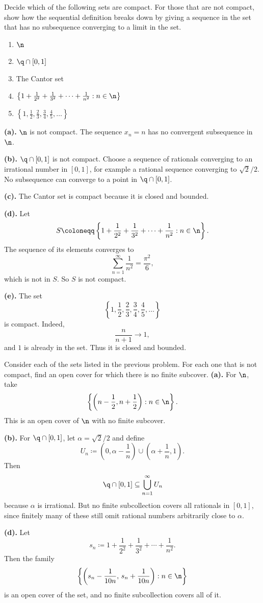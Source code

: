 \begin{problem}{
    Decide which of the following sets are compact.
    For those that are not compact, show how the sequential definition breaks down by giving a sequence in the set that has no subsequence converging to a limit in the set.
    \begin{enumerate}[label={(\alph*)}]
	\item $\n$
    \item $\q\cap[0,1]$
    \item The Cantor set
    \item $\left\{1+\frac1{2^2}+\frac1{3^2}+\cdots+\frac1{n^2}: n\in\n\right\}$
    \item $\left\{1,\frac12,\frac23,\frac34,\frac45,\ldots\right\}$
    \end{enumerate}
}
    \textbf{(a).}
    $\n$ is not compact.
    The sequence $x_n=n$ has no convergent subsequence in $\n$.

    \textbf{(b).}
    $\q\cap[0,1]$ is not compact.
    Choose a sequence of rationals converging to an irrational number in $[0,1]$, for example a rational sequence converging to $\sqrt{2}/2$.
    No subsequence can converge to a point in $\q\cap[0,1]$.

    \textbf{(c).}
    The Cantor set is compact because it is closed and bounded.

    \textbf{(d).}
    Let
    \[
        S\coloneqq \left\{1+\frac1{2^2}+\frac1{3^2}+\cdots+\frac1{n^2}: n\in\n\right\}.
    \]
    The sequence of its elements converges to
    \[
        \sum_{n=1}^\infty \frac1{n^2}=\frac{\pi^2}{6},
    \]
    which is not in $S$.
    So $S$ is not compact.

    \textbf{(e).}
    The set
    \[
        \left\{1,\frac12,\frac23,\frac34,\frac45,\ldots\right\}
    \]
    is compact.
    Indeed,
    \[
        \frac{n}{n+1}\to 1,
    \]
    and $1$ is already in the set.
    Thus it is closed and bounded.
\end{problem}

\begin{problem}{
    Consider each of the sets listed in the previous problem.
    For each one that is not compact, find an open cover for which there is no finite subcover.
}
    \textbf{(a).}
    For $\n$, take
    \[
        \left\{\left(n-\frac12,n+\frac12\right) : n\in\n\right\}.
    \]
    This is an open cover of $\n$ with no finite subcover.

    \textbf{(b).}
    For $\q\cap[0,1]$, let $\alpha=\sqrt{2}/2$ and define
    \[
        U_n \coloneqq \left(0,\alpha-\frac1n\right)\cup\left(\alpha+\frac1n,1\right).
    \]
    Then
    \[
        \q\cap[0,1]\subseteq \bigcup_{n=1}^\infty U_n
    \]
    because $\alpha$ is irrational.
    But no finite subcollection covers all rationals in $[0,1]$, since finitely many of these still omit rational numbers arbitrarily close to $\alpha$.

    \textbf{(d).}
    Let
    \[
        s_n \coloneqq 1+\frac1{2^2}+\frac1{3^2}+\cdots+\frac1{n^2}.
    \]
    Then the family
    \[
        \left\{\left(s_n-\frac{1}{10n},\,s_n+\frac{1}{10n}\right) : n\in\n\right\}
    \]
    is an open cover of the set, and no finite subcollection covers all of it.
\end{problem}


